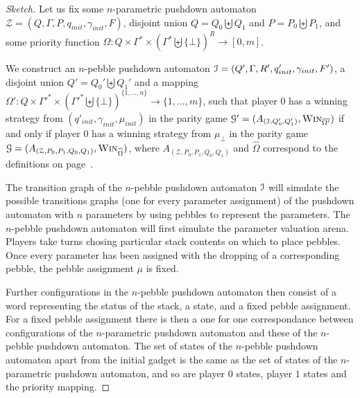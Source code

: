 \documentclass[a4paper,UKenglish,cleveref, autoref, thm-restate]{lipics-v2021}
\newcommand{\win}{\textsc{Win}}
\begin{document}
\begin{proof}[Sketch]


Let us fix some
$n$-parametric pushdown automaton $\mathcal{Z}= (Q, \Gamma, 
P, q_{init}, { \gamma_{init}} , F)$,
 disjoint
union $Q = Q_0  \biguplus Q_1$
and $P = P_0 \biguplus P_1$,
and
some priority function 
$\Omega : Q \times \Gamma^* \times ( \Gamma^* \biguplus \{ \bot \})^R \to [0, m ]$.


We construct
  an 
 $n$-pebble pushdown automaton $\mathcal{I} =(Q', \Gamma,  R', q_{init}', {\gamma_{init}} , F')$,
a 
 disjoint
union $Q' = Q_0'  \biguplus Q_1'$
and a mapping $\Omega' : Q \times  \Gamma'^* \times ( \Gamma'^* \biguplus \{ \bot \})^{\{1, \ldots, n\}} \to \{1, \ldots, m \}$,
such that
player $0$ has a winning strategy from 
$(q'_{init},\gamma_{init}, \mu_{init})$
in
the parity game
$\mathcal{G'}= (A_{(\ppda, Q'_0, Q'_1)}, \win_{\overline{\Omega'}})$
if and only if
player $0$ has a 
winning strategy from $\mu_\bot$ in 
the parity game
$\mathcal{G} =(A_{(\mathcal{Z}, P_0, P_1, Q_0 , Q_1)}, \win_{\widehat{\Omega}})$,
where		 
$A_{(\mathcal{Z}, P_0, P_1, Q_0 , Q_1)}$
and
$\widehat{\Omega}$
correspond to the definitions on page~\pageref{PPDA reachability game}.




The transition graph of the $n$-pebble pushdown automaton $\mathcal{I}$ will simulate the possible transitions graphs 
(one for every 
parameter assignment)
 of the pushdown automaton with $n$ parameters by using pebbles to represent the parameters. 
The $n$-pebble pushdown automaton will first simulate the 
parameter valuation arena.
Players take turns chosing particular stack contents on which to place pebbles. 
Once every parameter has been assigned with the dropping of a corresponding pebble, 
the pebble assignment $\mu$ is fixed.



Further configurations in the $n$-pebble pushdown automaton then consist of a word representing the status of the stack, a state, and a fixed pebble assignment. For a fixed pebble assignment there is then a one for one correspondance between configurations of the $n$-parametric pushdown 
automaton 
and these of the $n$-pebble pushdown automaton. The set of states of the $n$-pebble pushdown automaton apart from the initial gadget is the same as 
the set of states of the $n$-parametric pushdown automaton, and 
so are player $0$ states, player $1$ states and the priority mapping.
\end{proof}
\end{document}
